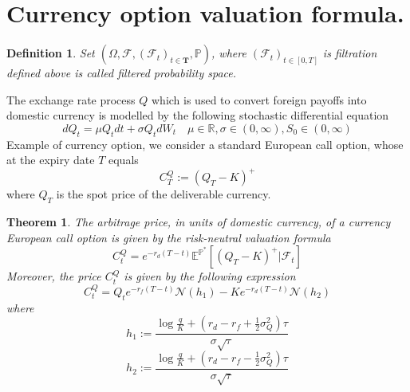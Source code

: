 \documentclass{book}
\newtheorem{definition}{Definition}[section]
\newtheorem{theorem}{Theorem}[section]
\begin{document}
\section{Currency option valuation formula.}
\begin{definition}
Set $(\varOmega,\mathcal{F},(\mathcal{F}_{t})_{t\in\mathbf{T}},\mathbb{P})$, where $(\mathcal{F}_{t})_{t\in[0,T]}$ is filtration defined above is called filtered probability space.
\end{definition}
The exchange rate process $Q$ which is used to convert foreign payoffs into domestic currency is modelled by the following stochastic differential equation
$$
dQ_{t}=\mu Q_{t}dt+\sigma Q_{t}dW_{t}\quad\mu\in\mathbb{R},\sigma\in(0,\infty),S_{0}\in(0,\infty)
$$
Example of currency option, we consider a standard European call option, whose at the expiry date $T$ equals 
$$
C^{Q}_{T}:=(Q_{T}-K)^{+}
$$
where $Q_{T}$ is the spot price of the deliverable currency.
\begin{theorem}
The arbitrage price, in units of domestic currency, of a currency European call option is given by the risk-neutral valuation formula 
$$
C_{t}^{Q}=e^{-r_{d}(T-t)}\mathbb{E}^{\mathbb{P}^{\ast}}\left[(Q_{T}-K)^{+}|\mathcal{F}_{t}\right]
$$
Moreover, the price $C_{t}^{Q}$ is given by the following expression
$$
C_{t}^{Q}=Q_{t}e^{-r_{f}(T-t)}\mathcal{N}(h_{1})-Ke^{-r_{d}(T-t)}\mathcal{N}(h_{2})
$$ 
where 
$$
h_{1}:=\frac{\log\frac{q}{K}+(r_{d}-r_{f}+\frac{1}{2}\sigma_{Q}^{2})\tau}{\sigma\sqrt{\tau}}
$$
$$
h_{2}:=\frac{\log\frac{q}{K}+(r_{d}-r_{f}-\frac{1}{2}\sigma_{Q}^{2})\tau}{\sigma\sqrt{\tau}}
$$
\end{theorem}
\end{document}
